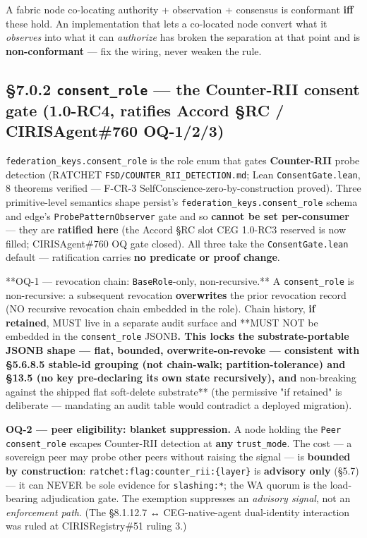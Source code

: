 \documentclass[10pt]{article}
\begin{document}
A fabric node co-locating authority + observation + consensus is conformant \textbf{iff} these hold. An implementation that lets a co-located node convert what it \textit{observes} into what it can \textit{authorize} has broken the separation at that point and is \textbf{non-conformant} — fix the wiring, never weaken the rule.


\subsection*{§7.0.2 \texttt{consent\_role} — the Counter-RII consent gate (1.0-RC4, ratifies Accord §RC / CIRISAgent\#760 OQ-1/2/3)}


\texttt{federation\_keys.consent\_role} is the role enum that gates \textbf{Counter-RII} probe detection (RATCHET \texttt{FSD/COUNTER\_RII\_DETECTION.md}; Lean \texttt{ConsentGate.lean}, 8 theorems verified — F-CR-3 SelfConscience-zero-by-construction proved). Three primitive-level semantics shape persist's \texttt{federation\_keys.consent\_role} schema and edge's \texttt{ProbePatternObserver} gate and so \textbf{cannot be set per-consumer} — they are \textbf{ratified here} (the Accord §RC slot CEG 1.0-RC3 reserved is now filled; CIRISAgent\#760 OQ gate closed). All three take the \texttt{ConsentGate.lean} default — ratification carries \textbf{no predicate or proof change}.


**OQ-1 — revocation chain: \texttt{BaseRole}-only, non-recursive.** A \texttt{consent\_role} is non-recursive: a subsequent revocation \textbf{overwrites} the prior revocation record (NO recursive revocation chain embedded in the role). Chain history, \textbf{if retained}, MUST live in a separate audit surface and **MUST NOT be embedded in the \texttt{consent\_role} JSONB\textbf{. This locks the substrate-portable JSONB shape — flat, bounded, overwrite-on-revoke — consistent with §5.6.8.5 stable-id grouping (not chain-walk; partition-tolerance) and §13.5 (no key pre-declaring its own state recursively), and }non-breaking against the shipped flat soft-delete substrate** (the permissive "if retained" is deliberate — mandating an audit table would contradict a deployed migration).


\textbf{OQ-2 — peer eligibility: blanket suppression.} A node holding the \texttt{Peer} \texttt{consent\_role} escapes Counter-RII detection at \textbf{any} \texttt{trust\_mode}. The cost — a sovereign peer may probe other peers without raising the signal — is \textbf{bounded by construction}: \texttt{ratchet:flag:counter\_rii:\{layer\}} is \textbf{advisory only} (§5.7) — it can NEVER be sole evidence for \texttt{slashing:*}; the WA quorum is the load-bearing adjudication gate. The exemption suppresses an \textit{advisory signal}, not an \textit{enforcement path}. (The §8.1.12.7 ↔ CEG-native-agent dual-identity interaction was ruled at CIRISRegistry\#51 ruling 3.)
\end{document}
